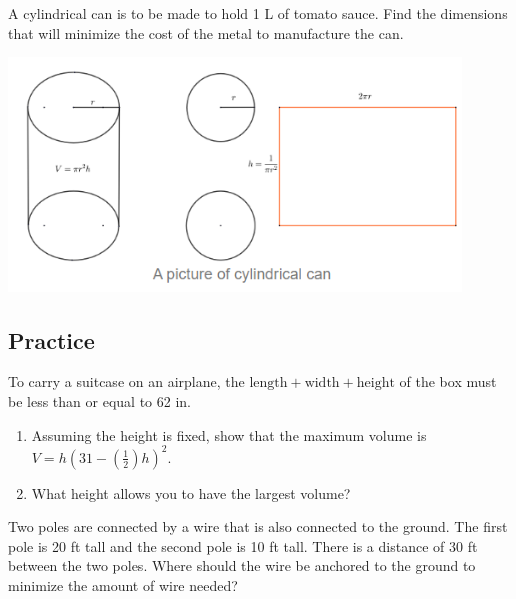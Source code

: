 \begin{example}

A cylindrical can is to be made to hold 1 L of tomato sauce. Find the
dimensions that will minimize the cost of the metal to manufacture the
can.

\includegraphics[width=0.9\textwidth]{img/image-20200420234447905.png}

\end{example}
\vspace*{6\baselineskip}

\subsection{Practice}

\begin{exercise}

To carry a suitcase on an airplane, the
\(\text{length} + \text{width} + \text{height}\) of the box must be less
than or equal to 62 in.

\begin{enumerate}
\item
  Assuming the height is fixed, show that the maximum volume is
  \(V=h(31 - (\frac{1}{2})h)^2.\)
\item
  What height allows you to have the largest volume?
\end{enumerate}

\end{exercise}

\begin{exercise}

Two poles are connected by a wire that is also connected to the ground.
The first pole is 20 ft tall and the second pole is 10 ft tall. There is
a distance of 30 ft between the two poles. Where should the wire be
anchored to the ground to minimize the amount of wire needed?

\end{exercise}
\vspace*{6\baselineskip}




